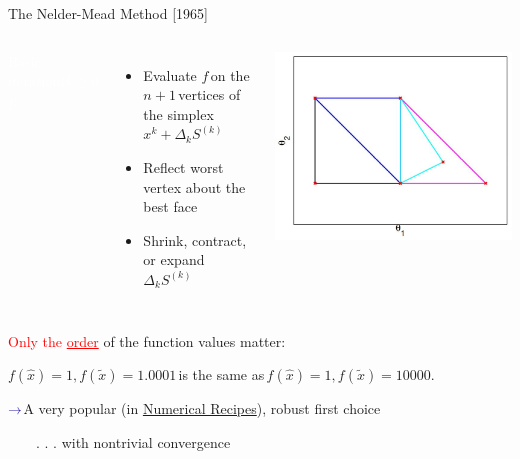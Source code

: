 \documentclass[handout,aspectratio=54]{beamer}
\numberwithin{theorem}{section}
\begin{document}
\begin{frame}{The Nelder-Mead Method [1965]}
\begin{columns}
\colorbox[rgb]{0.5,0.6,0.7}{\textcolor{white}{Basic iteration($k\ge0$):}}
\begin{itemize}\footnotesize
\item Evaluate $f$\,on the $n+1$\,vertices of the simplex\,$x^k+\Delta_kS^{(k)}$
\item Reflect worst vertex about the best face
\item Shrink, contract, or expand\,$\Delta_kS^{(k)}$
\end{itemize}

\includegraphics[width=\textwidth]{fig/18-4.jpg}
\end{columns}

\small
\textcolor{red}{Only the \underline{order}} of the function values matter:

$f(\hat{x})=1,f(\tilde{x})=1.0001$\,is the same as\,$f(\hat{x})=1,f(\tilde{x})=10000$.

$\textcolor{blue}{\rightarrow }$A very popular (in \underline{Numerical Recipes}), robust first choice

$\qquad$. . . with nontrivial convergence

\scriptsize
{}
\end{frame}
\end{document}
